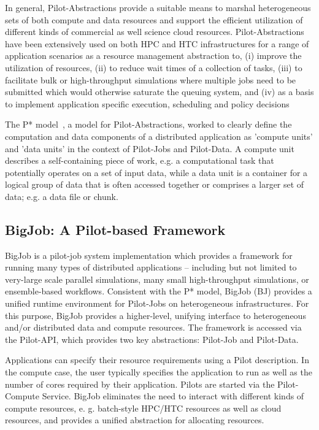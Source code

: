 \documentclass{sig-alternate}
\begin{document}
In general, Pilot-Abstractions provide a suitable means to marshal
heterogeneous sets of both compute and data resources and support the
efficient utilization of different kinds of commercial as well science
cloud resources. Pilot-Abstractions have been extensively used on both
HPC and HTC infrastructures for a range of application scenarios as a
resource management abstraction to, (i) improve the utilization of
resources, (ii) to reduce wait times of a collection of tasks, (iii)
to facilitate bulk or high-throughput simulations where multiple jobs
need to be submitted which would otherwise saturate the queuing
system, and (iv) as a basis to implement application specific
execution, scheduling and policy decisions

The P* model~\cite{pstar12}, a model for Pilot-Abstractions, worked to
clearly define the computation and data components of a distributed
application as 'compute units' and 'data units' in the context of
Pilot-Jobs and Pilot-Data. A compute unit describes a self-containing
piece of work, e.g. a computational task that potentially operates on
a set of input data, while a data unit is a container for a logical
group of data that is often accessed together or comprises a larger
set of data; e.g. a data file or chunk.


\subsection{BigJob: A Pilot-based Framework}

BigJob is a pilot-job system implementation which provides a framework
for running many types of distributed applications -- including but
not limited to very-large scale parallel simulations, many small
high-throughput simulations, or ensemble-based workflows. Consistent
with the P* model, BigJob (BJ) provides a unified runtime
environment for Pilot-Jobs on heterogeneous
infrastructures. For this purpose, BigJob provides a higher-level,
unifying interface to heterogeneous and/or distributed data and
compute resources. The framework is accessed via the Pilot-API, which
provides two key abstractions: Pilot-Job and Pilot-Data.

Applications can specify their resource requirements using a Pilot
description. In the compute case, the user typically specifies the
application to run as well as the number of cores required by their
application.  Pilots are started via the Pilot-Compute Service. BigJob 
eliminates the need to interact with different kinds of compute
resources, e. g. batch-style HPC/HTC resources as well as cloud
resources, and provides a unified abstraction for allocating
resources. 
\end{document}

